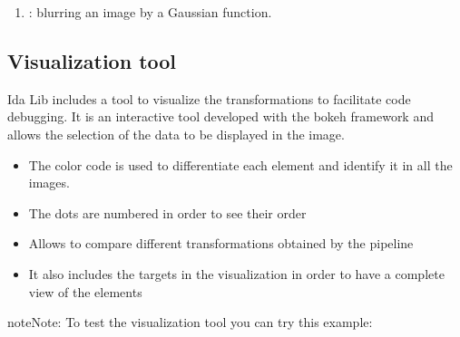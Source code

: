 \documentclass[letterpaper,10pt,english]{sphinxmanual}
\begin{document}
\begin{enumerate}
%
\setcounter{enumi}{16}
\item {} 
: blurring an image by a Gaussian function.

\end{enumerate}



\subsection{Visualization tool}
\label{\detokenize{overview:visualization-tool}}
Ida Lib includes a tool to visualize the transformations to facilitate code debugging.
It is an interactive tool developed with the bokeh framework and allows the selection of the data to be displayed in the image.
\begin{itemize}
\item {} 
The color code is used to differentiate each element and identify it in all the images.

\item {} 
The dots are numbered in order to see their order

\item {} 
Allows to compare different transformations obtained by the pipeline

\item {} 
It also includes the targets in the visualization in order to have a complete view of the elements

\end{itemize}


\begin{sphinxadmonition}{note}{Note:}
To test the visualization tool you can try this example:
\end{sphinxadmonition}
\end{document}
